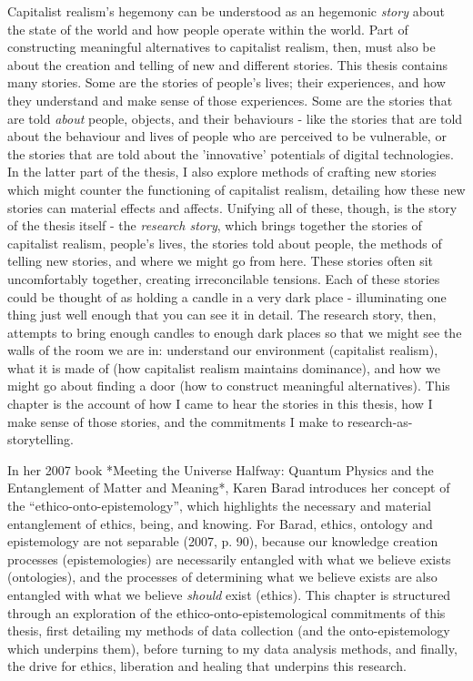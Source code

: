 Capitalist realism's hegemony can be understood as an hegemonic \textit{story} about the state of the world and how people operate within the world. Part of constructing meaningful alternatives to capitalist realism, then, must also be about the creation and telling of new and different stories. This thesis contains many stories. Some are the stories of people’s lives; their experiences, and how they understand and make sense of those experiences. Some are the stories that are told \textit{about} people, objects, and their behaviours - like the stories that are told about the behaviour and lives of people who are perceived to be vulnerable, or the stories that are told about the 'innovative' potentials of digital technologies. In the latter part of the thesis, I also explore methods of  crafting new stories which might counter the functioning of capitalist realism, detailing how these new stories can material effects and affects. Unifying all of these, though, is the story of the thesis itself - the \textit{research story}, which brings together the stories of capitalist realism, people's lives, the stories told about people, the methods of telling new stories, and where we might go from here. These stories often sit uncomfortably together, creating irreconcilable tensions. Each of these stories could be thought of as holding a candle in a very dark place - illuminating one thing just well enough that you can see it in detail. The research story, then, attempts to bring enough candles to enough dark places so that we might see the walls of the room we are in: understand our environment (capitalist realism), what it is made of (how capitalist realism maintains dominance), and how we might go about finding a door (how to construct meaningful alternatives). This chapter is the account of how I came to hear the stories in this thesis, how I make sense of those stories, and the commitments I make to research-as-storytelling. 

In her 2007 book *Meeting the Universe Halfway: Quantum Physics and the Entanglement of Matter and Meaning*, Karen Barad introduces her concept of the “ethico-onto-epistemology”, which highlights the necessary and material entanglement of ethics, being, and knowing. For Barad, ethics, ontology and epistemology are not separable (2007, p. 90), because our knowledge creation processes (epistemologies) are necessarily entangled with what we believe exists (ontologies), and the processes of determining what we believe exists are also entangled with what we believe \textit{should} exist (ethics). This chapter is structured through an exploration of the ethico-onto-epistemological commitments of this thesis, first detailing my methods of data collection (and the onto-epistemology which underpins them), before turning to my data analysis methods, and finally, the drive for ethics, liberation and healing that underpins this research. 

